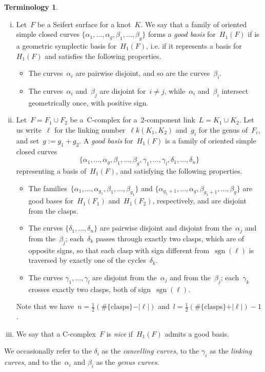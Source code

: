 \documentclass[10.9pt,a4paper]{amsart}
\theoremstyle{definition}
\newtheorem{terminology}[theorem]{Terminology}
\theoremstyle{remark}
\newcommand{\sgn}{\operatorname{sgn}}
\begin{document}
\begin{terminology}
\label{ter:geo-symp-good}
~
\begin{enumerate}[(i)]
\item Let~$F$ be a Seifert surface for a knot~$K$. 
We say that a family of oriented simple closed curves $\{\alpha_1,\dots,\alpha_g,\beta_1,\dots,\beta_g\}$ forms a {\em good basis\/} for~$H_1(F)$ if is a geometric symplectic basis for~$H_1(F)$, i.e. if
it represents a basis for~$H_1(F)$ and satisfies the following properties.
\begin{itemize}
\item The curves~$\alpha_i$ are pairwise disjoint, and so are the curves~$\beta_i$.
\item The curves~$\alpha_i$ and~$\beta_j$ are disjoint for~$i\neq j$, while~$\alpha_i$ and~$\beta_i$ intersect geometrically once, with positive sign.
\end{itemize}
\item Let~$F = F_1 \cup F_2$ be a~C-complex for a~$2$-component link~$L=K_1\cup K_2$. 
Let us write~$\ell$ for the linking number~$\ell k(K_1,K_2)$ and~$g_i $ for the genus of~$F_i$, and set~$g:=g_1+g_2$. A \emph{good basis\/} for~$H_1(F)$ is a family of oriented simple closed curves
\[
\{\alpha_1,\ldots,\alpha_{g}, \beta_1,\ldots,\beta_{g}, \gamma_1,\ldots,\gamma_l, \delta_1, \ldots, \delta_n\}
\]
representing a basis of~$H_1(F)$, and satisfying the following properties.
\begin{itemize}
  \item The families~$ \{\alpha_1,\ldots,\alpha_{g_1}, \beta_1,\ldots,\beta_{g_1}\} $ and $ \{\alpha_{g_1+1},\ldots,\alpha_{g}, \beta_{g_1+1},\ldots,\beta_{g}\} $ are good bases for~$H_1(F_1) $ and~$H_1(F_2) $, respectively, and are disjoint from the clasps.
  \item The curves $\{\delta_1, \ldots, \delta_n\}$ are pairwise disjoint and disjoint from the~$\alpha_j$ and from the~$\beta_j$; each~$\delta_k$ passes through exactly two clasps, which are of opposite signs, so that each clasp with sign different from~$\sgn(\ell)$ is traversed by exactly one of the cycles~$\delta_k$.
   \item The curves $\gamma_1, \ldots, \gamma_l$ are disjoint from the~$\alpha_j$ and from the~$\beta_j$; each~$\gamma_k$ crosses exactly two clasps, both of sign~$\sgn(\ell)$.
\end{itemize}
Note that we have~$n=\frac{1}{2}(\#\{\text{clasps}\}-\vert\ell\vert)$ and~$l=\frac{1}{2}(\#\{\text{clasps}\}+\vert\ell\vert)-1$.
\item We say that a C-complex~$F$ is {\em nice\/} if~$H_1(F)$ admits a good basis.
\end{enumerate}
We occasionally refer to the $\delta_i$ as the \emph{cancelling curves}, to the $\gamma_i$ as the \emph{linking curves}, and to the~$\alpha_i$ and $\beta_i$ as the \emph{genus curves}.
\end{terminology}
\end{document}
